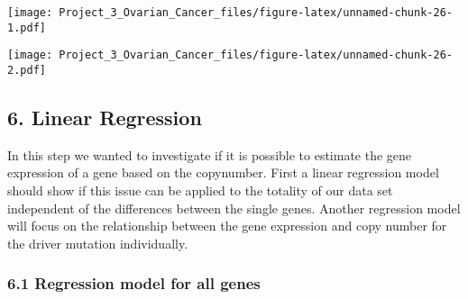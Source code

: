 \documentclass[]{article}
\newenvironment{Shaded}{\begin{snugshade}}{\end{snugshade}}
\newcommand{\CommentTok}[1]{\textcolor[rgb]{0.56,0.35,0.01}{\textit{#1}}}
\newcommand{\DataTypeTok}[1]{\textcolor[rgb]{0.13,0.29,0.53}{#1}}
\newcommand{\DecValTok}[1]{\textcolor[rgb]{0.00,0.00,0.81}{#1}}
\newcommand{\KeywordTok}[1]{\textcolor[rgb]{0.13,0.29,0.53}{\textbf{#1}}}
\newcommand{\NormalTok}[1]{#1}
\newcommand{\OperatorTok}[1]{\textcolor[rgb]{0.81,0.36,0.00}{\textbf{#1}}}
\newcommand{\StringTok}[1]{\textcolor[rgb]{0.31,0.60,0.02}{#1}}
\begin{document}
\texttt{[image: Project\_3\_Ovarian\_Cancer\_files/figure-latex/unnamed-chunk-26-1.pdf]}

\begin{Shaded}
\end{Shaded}

\texttt{[image: Project\_3\_Ovarian\_Cancer\_files/figure-latex/unnamed-chunk-26-2.pdf]}

\hypertarget{linear-regression}{%
\subsection{6. Linear Regression}\label{linear-regression}}

In this step we wanted to investigate if it is possible to estimate the
gene expression of a gene based on the copynumber. First a linear
regression model should show if this issue can be applied to the
totality of our data set independent of the differences between the
single genes. Another regression model will focus on the relationship
between the gene expression and copy number for the driver mutation
individually.

\hypertarget{regression-model-for-all-genes}{%
\subsubsection{6.1 Regression model for all
genes}\label{regression-model-for-all-genes}}
\end{document}
